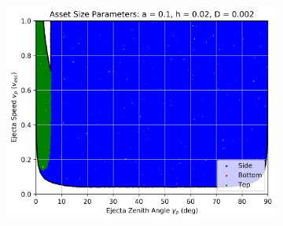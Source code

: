 \documentclass{article}
\begin{document}
\begin{figure}
\begin{subfigure}[t]{.32\textwidth}
		\label{fig:sub-asset_speed_zenith_2}
	\end{subfigure}
	\begin{subfigure}[t]{.32\textwidth}
		\centering
		\includegraphics[width=.95\linewidth]{asset_speed_zenith_plot_1.000e-01_2.000e-02_2.000e-03.png}  
		\label{fig:sub-asset_speed_zenith_3}
	\end{subfigure}
	
	

\end{figure}
\end{document}
